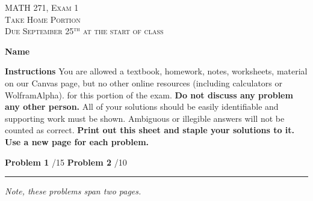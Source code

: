 \documentclass[12pt]{amsbook}
\begin{document}

\begin{center}
   \textsc{\large MATH 271, Exam 1}\\
   \textsc{Take Home Portion}\\
   \textsc{Due September 25$^\textrm{th}$ at the start of class}
\end{center}
\vspace{1cm}

\noindent\textbf{Name} \; \underline{\hspace{8cm}}

\vspace{1cm}

\noindent\textbf{Instructions} \; You are allowed a textbook, homework, notes, worksheets, material on our Canvas page, but no other online resources (including calculators or WolframAlpha). for this portion of the exam.  \textbf{Do not discuss any problem any other person.} All of your solutions should be easily identifiable and supporting work must be shown.  Ambiguous or illegible answers will not be counted as correct. \textbf{Print out this sheet and staple your solutions to it. Use a new page for each problem.}


\vspace{1cm}

\begin{center}\textbf{Problem 1} \; \underline{\hspace{1cm}}/15 \qquad \qquad \textbf{Problem 2} \; \underline{\hspace{1cm}}/10\end{center}

\vspace{1cm}

\hrule

\vspace*{1cm}
\noindent\emph{Note, these problems span two pages.}
\end{document}
